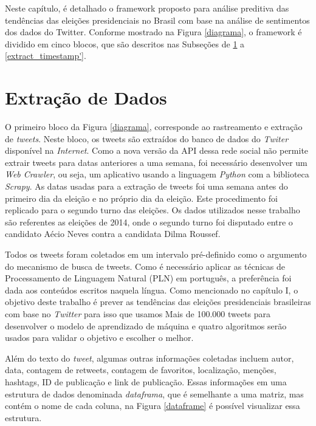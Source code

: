 Neste capítulo, é detalhado o framework proposto para análise
preditiva das tendências das eleições presidenciais no Brasil
com base na análise de sentimentos dos dados do Twitter.
Conforme mostrado na Figura \ref{diagrama}, o framework é dividido em
cinco blocos, que são descritos nas Subseções de \ref{extract} a \ref{extract_timestamp'}.


%


\section{Extração de Dados}
\label{extract}

O primeiro bloco da Figura \ref{diagrama}, corresponde ao rastreamento
e extração de \textit{tweets}. Neste bloco, os tweets são extraídos do
banco de dados do \textit{Twiter} disponível na \textit{Internet}. Como a nova
versão da \acrshort{API} dessa rede social não permite extrair tweets para datas
anteriores a uma semana, foi necessário desenvolver um \textit{Web
Crawler}, ou seja, um aplicativo usando a linguagem \textit{Python}
com a biblioteca \textit{Scrapy}. As datas usadas para a extração de
tweets foi uma semana antes do primeiro dia da eleição e no
próprio dia da eleição. Este procedimento foi replicado para
o segundo turno das eleições. Os dados utilizados nesse trabalho são referentes as eleições de 2014, onde o segundo turno
foi disputado entre o candidato Aécio Neves contra a candidata Dilma Roussef.


Todos os tweets foram coletados em um intervalo pré-definido
como o argumento do mecanismo de busca de tweets.
Como é necessário aplicar as técnicas de Processamento de
Linguagem Natural (PLN) em português, a preferência foi
dada aos conteúdos escritos naquela língua. Como mencionado
no capítulo I, o objetivo deste trabalho é prever as tendências
das eleições presidenciais brasileiras com base no \textit{Twitter} para
isso que usamos Mais de 100.000 tweets para desenvolver o
modelo de aprendizado de máquina e quatro algoritmos serão
usados para validar o objetivo e escolher o melhor.

Além do texto do \textit{tweet}, algumas outras informações coletadas
incluem autor, data, contagem de retweets, contagem de
favoritos, localização, menções, hashtags, ID de publicação e
link de publicação. Essas informações em uma estrutura de dados denominada \textit{dataframa}, que é semelhante a uma matriz, mas contém o nome de cada 
coluna, na Figura \ref{dataframe} é possível visualizar essa estrutura.

